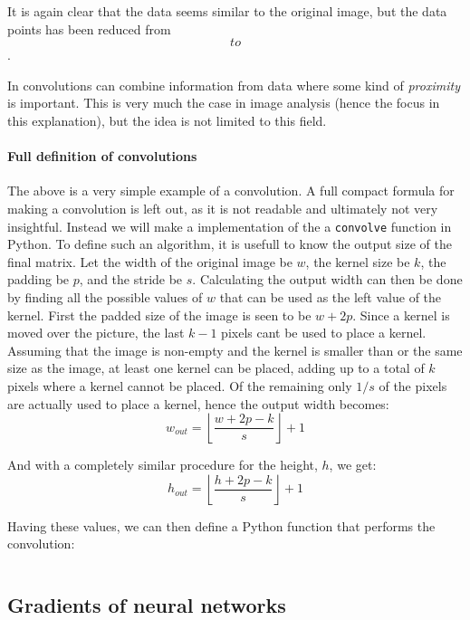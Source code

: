 \documentclass[11pt,a4paper]{article}
\begin{document}
It is again clear that the data seems similar to the original image, but the data points
has been reduced from $$ to $$.

In convolutions can combine information from data where some kind of \textit{proximity} is important.
This is very much the case in image analysis (hence the focus in this explanation), but the idea is
not limited to this field.

\paragraph{Full definition of convolutions}\label{sec:convolution_definition}
The above is a very simple example of a convolution.
A full compact formula for making a convolution is left out, as it is not readable and
ultimately not very insightful. 
Instead we will make a implementation of the a \verb|convolve| function in Python.
To define such an algorithm, it is usefull to know the output size of the final matrix.
Let the width of the original image be $w$, the kernel size be $k$, the padding be $p$, and the stride be $s$.
Calculating the output width can then be done by finding all the possible values of $w$ that can be
used as the left value of the kernel.
First the padded size of the image is seen to be $w + 2p$.
Since a kernel is moved over the picture, the last $k-1$ pixels cant be used to place a kernel.
Assuming that the image is non-empty and the kernel is smaller than or the same size as the image,
at least one kernel can be placed, adding up to a total of $k$ pixels where a kernel cannot be placed.
Of the remaining only $1/s$ of the pixels are actually used to place a kernel, hence the output width becomes:
\begin{equation}
    w_{out} = \left\lfloor \frac{w + 2p - k}{s}\right\rfloor + 1
\end{equation}

And with a completely similar procedure for the height, $h$, we get:
\begin{equation}
    h_{out} = \left\lfloor \frac{h + 2p - k}{s} \right\rfloor + 1
\end{equation}

Having these values, we can then define a Python function that performs the convolution:

\inputminted[]{python}{src/convolve.py}


\subsection{Gradients of neural networks}
\end{document}
